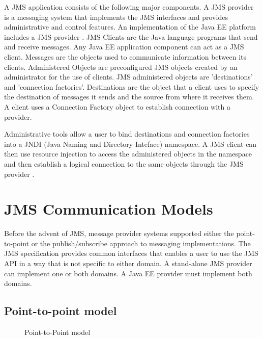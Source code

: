 \documentclass[9pt,twocolumn,twoside]{../../styles/osajnl}
\begin{document}
A JMS application consists of the following major components.  A JMS
provider is a messaging system that implements the JMS interfaces and
provides administrative and control features. An implementation of the
Java EE platform includes a JMS provider
\cite{www-jms-tutorialoracle}. JMS Clients are the Java language
programs that send and receive messages. Any Java EE application
component can act as a JMS client.  Messages are the objects used to
communicate information between its clients.  Administered Objects are
preconfigured JMS objects created by an administrator for the use of
clients.  JMS administered objects are 'destinations' and 'connection
factories'. Destinations are the object that a client uses to specify
the destination of messages it sends and the source from where it
receives them.  A client uses a Connection Factory object to establish
connection with a provider.

Administrative tools allow a user to bind destinations and connection
factories into a JNDI (Java Naming and Directory Inteface)
namespace. A JMS client can then use resource injection to access the
administered objects in the namespace and then establish a logical
connection to the same objects through the JMS provider
\cite{www-jms-tutorialoracle}.


\section{JMS Communication Models}

Before the advent of JMS, message provider systems supported either
the point-to-point or the publish/subscribe approach to messaging
implementations. The JMS specification provides common interfaces that
enables a user to use the JMS API in a way that is not specific to
either domain. A stand-alone JMS provider can implement one or both
domains. A Java EE provider must implement both domains.

\subsection{Point-to-point model}

\begin{figure}[htbp]
\centering
{}
\caption{\cite{www-jms-tutorialoracle} Point-to-Point model}
\label{fig:Point-to-Point messaging}
\end{figure}
\end{document}
